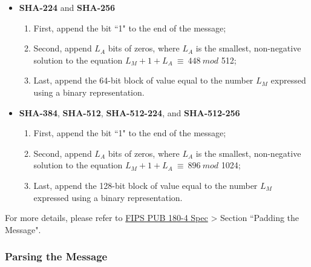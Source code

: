 \documentclass[main\_\_EN.tex]{subfiles}
\begin{document}
\begin{itemize}
    \item \textbf{SHA-224} and \textbf{SHA-256}
        \begin{enumerate}
            \item First, append the bit ``1" to the end of the message;
            \item Second, append \begin{math} L_A \end{math} bits of zeros, where \begin{math} L_A \end{math} is the smallest, non-negative solution to the equation \begin{math}L_M + 1 + L_A \ {\equiv} \ 448 \ mod \end{math} 512;
            \item Last, append the 64-bit block of value equal to the number \begin{math} L_M \end{math} expressed using a binary representation.
        \end{enumerate}
    \item \textbf{SHA-384}, \textbf{SHA-512}, \textbf{SHA-512-224}, and \textbf{SHA-512-256}
        \begin{enumerate}
            \item First, append the bit ``1" to the end of the message;
            \item Second, append \begin{math} L_A \end{math} bits of zeros, where \begin{math} L_A \end{math} is the smallest, non-negative solution to the equation \begin{math}L_M + 1 + L_A \ {\equiv} \ 896 \ mod \end{math} 1024;
            \item Last, append the 128-bit block of value equal to the number \begin{math} L_M \end{math} expressed using a binary representation.
        \end{enumerate}
\end{itemize}

For more details, please refer to \href{https://doi.org/10.6028/NIST.FIPS.180-4}{FIPS PUB 180-4 Spec} > Section ``Padding the Message".

\subsubsection{Parsing the Message}\label{sec:ecdsa-msg-parsing}
\end{document}
